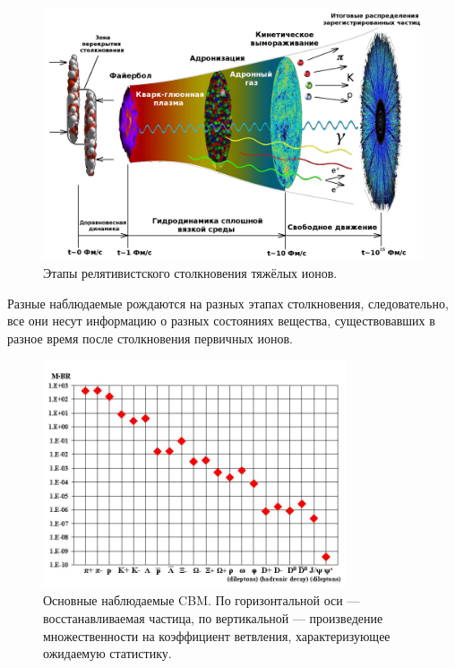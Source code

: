 \begin{figure}[H]
\includegraphics[width=1.0\textwidth]{pictures/little_bang_rus2.png}
\caption{Этапы релятивистского столкновения тяжёлых ионов.}
\label{fig:LittleBang}
\end{figure}

Разные наблюдаемые рождаются на разных этапах столкновения, следовательно, все они несут информацию о разных состояниях вещества, существовавших в разное время после столкновения первичных ионов.


\begin{figure}[H]
\includegraphics[width=0.8\textwidth]{pictures/CBM_observables.png}
\caption{Основные наблюдаемые CBM. По горизонтальной оси --- восстанавливаемая частица, по вертикальной --- произведение множественности на коэффициент ветвления, характеризующее ожидаемую статистику.}
\label{fig:CBMParticlesYields}
\end{figure}

